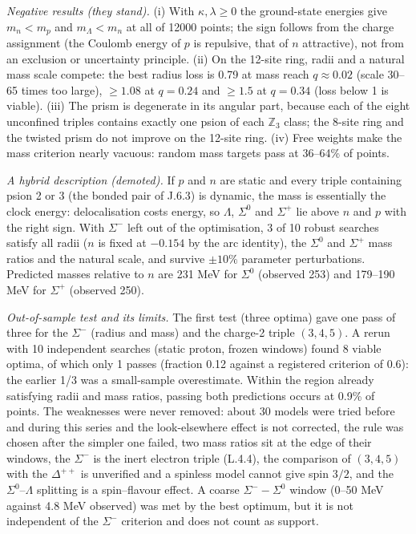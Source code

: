 \documentclass[11pt,letterpaper]{article}
\begin{document}
\noindent \emph{Negative results (they stand).} (i) With $\kappa,\lambda\ge0$ the ground-state energies give $m_n<m_p$ and $m_\Lambda<m_n$ at all of 12000 points; the sign follows from the charge assignment (the Coulomb energy of $p$ is repulsive, that of $n$ attractive), not from an exclusion or uncertainty principle. (ii) On the 12-site ring, radii and a natural mass scale compete: the best radius loss is 0.79 at mass reach $q\approx0.02$ (scale 30--65 times too large), $\ge1.08$ at $q=0.24$ and $\ge1.5$ at $q=0.34$ (loss below 1 is viable). (iii) The prism is degenerate in its angular part, because each of the eight unconfined triples contains exactly one psion of each $\mathbb{Z}_3$ class; the 8-site ring and the twisted prism do not improve on the 12-site ring. (iv) Free weights make the mass criterion nearly vacuous: random mass targets pass at 36--64\% of points.

\noindent \emph{A hybrid description (demoted).} If $p$ and $n$ are static and every triple containing psion 2 or 3 (the bonded pair of J.6.3) is dynamic, the mass is essentially the clock energy: delocalisation costs energy, so $\Lambda$, $\Sigma^0$ and $\Sigma^+$ lie above $n$ and $p$ with the right sign. With $\Sigma^-$ left out of the optimisation, 3 of 10 robust searches satisfy all radii ($n$ is fixed at $-0.154$ by the arc identity), the $\Sigma^0$ and $\Sigma^+$ mass ratios and the natural scale, and survive $\pm10\%$ parameter perturbations. Predicted masses relative to $n$ are 231 MeV for $\Sigma^0$ (observed 253) and 179--190 MeV for $\Sigma^+$ (observed 250).

\noindent \emph{Out-of-sample test and its limits.} The first test (three optima) gave one pass of three for the $\Sigma^-$ (radius and mass) and the charge-2 triple $(3,4,5)$. A rerun with 10 independent searches (static proton, frozen windows) found 8 viable optima, of which only 1 passes (fraction 0.12 against a registered criterion of 0.6): the earlier 1/3 was a small-sample overestimate. Within the region already satisfying radii and mass ratios, passing both predictions occurs at 0.9\% of points. The weaknesses were never removed: about 30 models were tried before and during this series and the look-elsewhere effect is not corrected, the rule was chosen after the simpler one failed, two mass ratios sit at the edge of their windows, the $\Sigma^-$ is the inert electron triple (L.4.4), the comparison of $(3,4,5)$ with the $\Delta^{++}$ is unverified and a spinless model cannot give spin $3/2$, and the $\Sigma^0$--$\Lambda$ splitting is a spin--flavour effect. A coarse $\Sigma^--\Sigma^0$ window (0--50 MeV against 4.8 MeV observed) was met by the best optimum, but it is not independent of the $\Sigma^-$ criterion and does not count as support.
\end{document}
